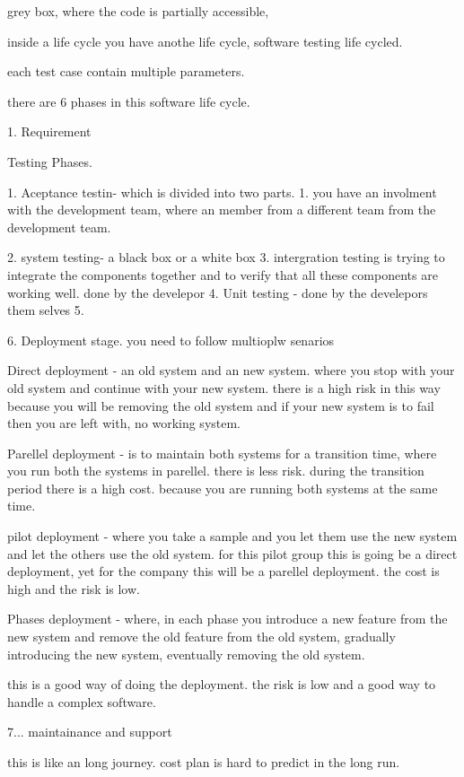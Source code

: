 \documentclass[a4paper]{article}
\begin{document}
grey box, where the code is partially accessible, 

inside a life cycle you have anothe life cycle, software testing life cycled.

each test case contain multiple parameters.
  
there are 6 phases in this software life cycle.

1. Requirement 


Testing Phases. 

1. Aceptance testin- which is divided into two parts.
    1. you have an involment with the development team, where an member from a different team from the development team.

2. system testing- a black box or a white box 
3. intergration testing is trying to integrate the components together and to verify that all these components are working well. done by the develepor
4. Unit testing - done by the develepors them selves
5.

6. Deployment stage.
 you need to follow multioplw senarios

Direct deployment - an old system and an new system. where you stop with your old system and continue with your new system.
there is a high risk in this way because you will be removing the old system and if your new system is to fail then you are left with, 
no working system.

Parellel deployment - is to maintain both systems for a transition time, where you run both the systems in parellel.
there is less risk. during the transition period there is a high cost. because you are running both systems at the same time.

pilot deployment - where you take a sample and you let them use the new system and let the others use the old system. for this pilot group this is 
going be a direct deployment, yet for the company this will be a parellel deployment. 
the cost is high and the risk is low.

Phases deployment - where, in each phase you introduce a new feature from the new system and remove the old feature from the old system, gradually
introducing the new system, eventually removing the old system.

this is a good way of doing the deployment.
the risk is low 
and a good way to handle a complex software.

7...
maintainance and support    

this is like an long journey.
cost plan is hard to predict in the long run.
\end{document}
